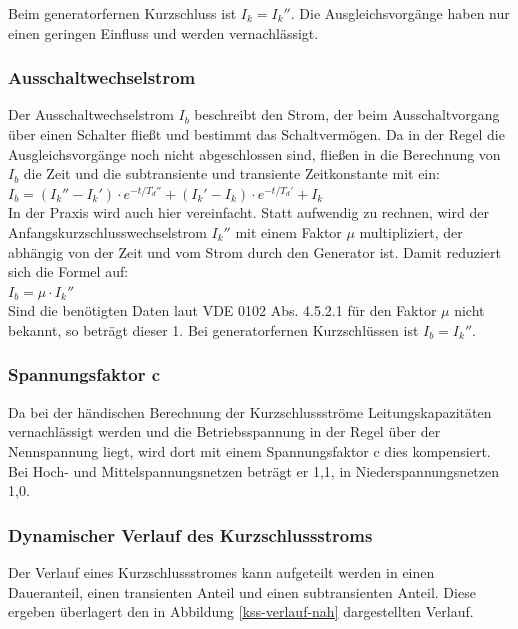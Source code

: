 \documentclass{scrartcl}
\begin{document}
\begin{onehalfspace}
 Beim generatorfernen Kurzschluss ist $I_k = I_k''$. Die Ausgleichsvorgänge haben nur einen geringen Einfluss und werden vernachlässigt.

\subsubsection{Ausschaltwechselstrom}
Der Ausschaltwechselstrom $I_b$ beschreibt den Strom, der beim Ausschaltvorgang über einen Schalter fließt und bestimmt das Schaltvermögen. Da in der Regel die Ausgleichsvorgänge noch nicht abgeschlossen sind, fließen in die Berechnung von $I_b$ die Zeit und die  subtransiente und transiente Zeitkonstante mit ein: \\

$I_b = (I_k'' - I_k') \cdot e ^{-t/T_d''} +  (I_k' - I_k) \cdot e ^{-t/T_d'} + I_k$ \\

In der Praxis wird auch hier vereinfacht. Statt aufwendig zu rechnen, wird der Anfangskurzschlusswechselstrom $I_k''$ mit einem Faktor $\mu$ multipliziert, der abhängig von der Zeit und vom Strom durch den Generator ist. Damit reduziert sich die Formel auf: \\

$I_b =  \mu \cdot I_k''$ \\

Sind die benötigten Daten laut VDE 0102 Abs. 4.5.2.1 für den Faktor $\mu$ nicht bekannt, so beträgt dieser 1. Bei generatorfernen Kurzschlüssen ist $I_b = I_k''$.


\subsubsection{Spannungsfaktor c}
Da bei der händischen Berechnung der Kurzschlussströme Leitungskapazitäten vernachlässigt werden und die Betriebsspannung in der Regel über der Nennspannung liegt, wird dort mit einem Spannungsfaktor c dies kompensiert. Bei Hoch- und Mittelspannungsnetzen beträgt er 1,1, in Niederspannungsnetzen 1,0.

\subsubsection{Dynamischer Verlauf des Kurzschlussstroms}
Der Verlauf eines Kurzschlussstromes kann aufgeteilt werden in einen Daueranteil, einen transienten Anteil und einen subtransienten Anteil. Diese ergeben überlagert den in Abbildung \ref{kss-verlauf-nah} dargestellten Verlauf.


\end{onehalfspace}
\end{document}
